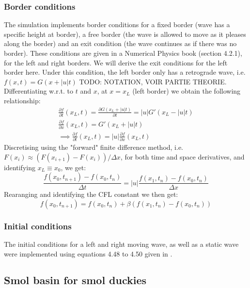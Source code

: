 \subsubsection{Border conditions}

The simulation implements border conditions for a fixed border (wave has a specific height at border), a free border (the wave is allowed to move as it pleases along the border) and an exit condition (the wave continues as if there was no border). These conditions are given in a Numerical Physics book \cite{physnumbook} (section 4.2.1), for the left and right borders. We will derive the exit conditions for the left border here. Under this condition, the left border only has a retrograde wave, i.e. \(f(x, t) = G(x + |u| t)\) TODO: NOTATION, VOIR PARTIE THEORIE. Differentiating w.r.t. to \(t\) and \(x\), at \(x = x_L\) (left border) we obtain the following relationship:
\begin{gather}
    \frac{\partial f}{\partial t}(x_L, t) = \frac{\partial G(x_L + |u| t)}{\partial t} = |u| G'(x_L - |u| t) \\
    \frac{\partial f}{\partial x}(x_L, t) = G'(x_L + |u| t) \\
    \implies \frac{\partial f}{\partial t}(x_L, t) = |u| \frac{\partial f}{\partial x}(x_L, t)
\end{gather}
Discretising using the "forward" finite difference method, i.e. \(F(x_i) \approx (F(x_{i+1}) - F(x_i))/\Delta x\), for both time and space derivatives, and identifying \(x_L \equiv x_0\), we get:
\begin{equation}
    \frac{f(x_0,t_{n+1}) - f(x_0, t_n)}{\Delta t} = |u| \frac{f(x_1, t_n) - f(x_0, t_n)}{\Delta x}
\end{equation}
Rearanging and identifying the CFL constant we then get:
\begin{equation}
    f(x_0, t_{n+1}) = f(x_0, t_n) + \beta \left( f(x_1, t_n) - f(x_0, t_n) \right)
\end{equation}

\subsubsection{Initial conditions}

The initial conditions for a left and right moving wave, as well as a static wave were implemented using equations 4.48 to 4.50 given in \cite{physnumbook}.

\subsection{Smol basin for smol duckies}

